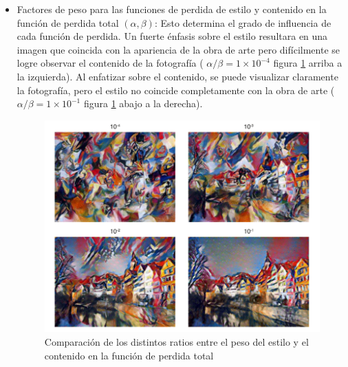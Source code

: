\documentclass[a4paper,11pt,spanish]{book}
\begin{document}
\begin{itemize}
	 \item Factores de peso para las funciones de perdida de estilo y contenido en la función de perdida total $(\alpha, \beta)$: Esto determina el grado de influencia
	  de cada función de perdida. 
	  Un fuerte énfasis sobre el estilo resultara en una imagen que coincida con la apariencia de la obra de arte pero difícilmente se logre observar el contenido de la fotografía 
	  ( $\alpha / \beta = 1 \times 10^{-4}$ figura \ref{fig:ratio_content_style} arriba a la izquierda). Al enfatizar sobre el contenido, se puede visualizar claramente la fotografía,
	  pero el estilo no coincide completamente con la obra de arte ( $\alpha / \beta = 1 \times 10^{-1}$ figura \ref{fig:ratio_content_style} abajo a la derecha).
	  \begin{figure}[h]
	    \includegraphics[width=\textwidth]{./img/ratio_content_style.png}
	    \caption{Comparación de los distintos ratios entre el peso del estilo y el contenido en la función de perdida total}
	    \label{fig:ratio_content_style}
	 \end{figure}
	 

\end{itemize}
\end{document}
